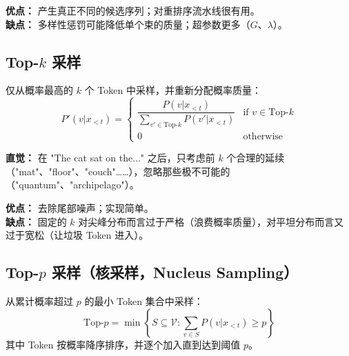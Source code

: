\textbf{优点：} 产生真正不同的候选序列；对重排序流水线很有用。\\

\textbf{缺点：} 多样性惩罚可能降低单个束的质量；超参数更多（$G$、$\lambda$）。

\subsection{\texorpdfstring{Top-$k$ 采样}{Top-k Sampling}}
\label{top-k-sampling}

仅从概率最高的 $k$ 个 Token 中采样，并重新分配概率质量：
\[
P'(v | x_{<t}) = \begin{cases}
    \dfrac{P(v | x_{<t})}{\sum_{v' \in \text{Top-}k} P(v' | x_{<t})} & \text{if } v \in \text{Top-}k \\[6pt]
    0 & \text{otherwise}
  \end{cases}
\]

\textbf{直觉：} 在 "The cat sat on the..." 之后，只考虑前 $k$ 个合理的延续（"mat"、"floor"、"couch"……），忽略那些极不可能的（"quantum"、"archipelago"）。

\textbf{优点：} 去除尾部噪声；实现简单。\\

\textbf{缺点：} 固定的 $k$ 对尖峰分布而言过于严格（浪费概率质量），对平坦分布而言又过于宽松（让垃圾 Token 进入）。

\subsection{\texorpdfstring{Top-$p$ 采样（核采样，Nucleus Sampling）}{Top-p (Nucleus) Sampling}}
\label{top-p-nucleus-sampling}

从累计概率超过 $p$ 的最小 Token 集合中采样：
\[
\text{Top-}p = \min \left\{ S \subseteq \mathcal{V} : \sum_{v \in S} P(v | x_{<t}) \geq p \right\}
\]
其中 Token 按概率降序排序，并逐个加入直到达到阈值 $p$。

